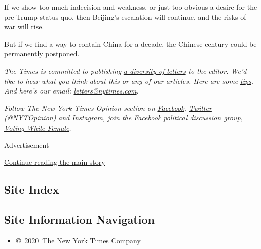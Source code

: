 If we show too much indecision and weakness, or just too obvious a
desire for the pre-Trump status quo, then Beijing's escalation will
continue, and the risks of war will rise.

But if we find a way to contain China for a decade, the Chinese century
could be permanently postponed.

\emph{The Times is committed to publishing}
\href{https://www.nytimes.com/2019/01/31/opinion/letters/letters-to-editor-new-york-times-women.html}{\emph{a
diversity of letters}} \emph{to the editor. We'd like to hear what you
think about this or any of our articles. Here are some}
\href{https://help.nytimes.com/hc/en-us/articles/115014925288-How-to-submit-a-letter-to-the-editor}{\emph{tips}}\emph{.
And here's our email:}
\href{mailto:letters@nytimes.com}{\emph{letters@nytimes.com}}\emph{.}

\emph{Follow The New York Times Opinion section on}
\href{https://www.facebook.com/nytopinion}{\emph{Facebook}}\emph{,}
\href{http://twitter.com/NYTOpinion}{\emph{Twitter (@NYTOpinion)}}
\emph{and}
\href{https://www.instagram.com/nytopinion/}{\emph{Instagram}}\emph{,
join the Facebook political discussion group,}
\href{https://www.facebook.com/groups/votingwhilefemale/}{\emph{Voting
While Female}}\emph{.}

Advertisement

\protect\hyperlink{after-bottom}{Continue reading the main story}

\hypertarget{site-index}{%
\subsection{Site Index}\label{site-index}}

\hypertarget{site-information-navigation}{%
\subsection{Site Information
Navigation}\label{site-information-navigation}}

\begin{itemize}
\tightlist
\item
  \href{https://help.nytimes.com/hc/en-us/articles/115014792127-Copyright-notice}{©~2020~The
  New York Times Company}
\end{itemize}

